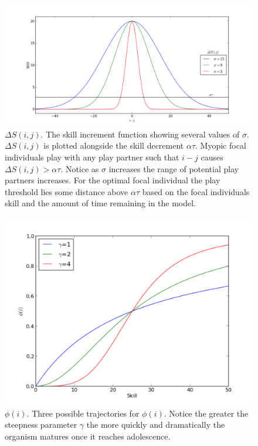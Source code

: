 \documentclass[12pt,letterpaper]{article}
\begin{document}
	\begin{figure}[h]
	\caption{$\Delta S(i,j)$. The skill increment function showing several values of $\sigma$. $\Delta S(i,j)$ is plotted alongside the skill decrement $\alpha \tau$. Myopic focal individuals play with any play partner such that $i-j$ causes $\Delta S(i,j)>\alpha \tau$. Notice as $\sigma$ increases the range of potential play partners increases. For the optimal focal individual the play threshold lies some distance above $\alpha \tau$ based on the focal individuals skill and the amount of time remaining in the model.      }
	\begin{center}
	\includegraphics[width=160mm]{sdf.pdf}
	\end{center}
	\label{sdf}
	\end{figure}
	
	\begin{figure}[h]
	\caption{$\phi(i)$. Three possible trajectories for $\phi(i)$. Notice the greater the steepness parameter $\gamma$ the more quickly and dramatically the organism matures once it reaches adolescence. }
	\begin{center}
	\includegraphics[width=160mm]{phi.pdf}
	\end{center}
	\label{phi}
	\end{figure}
\end{document}
